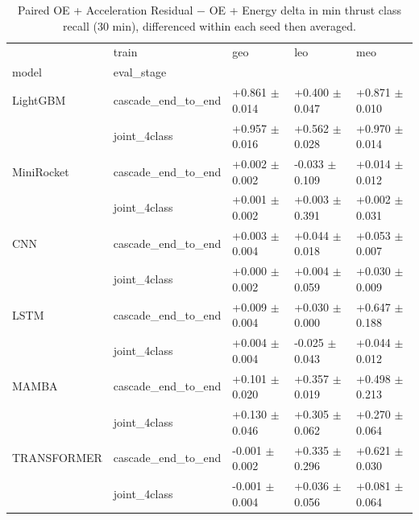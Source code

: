 \begin{table}
\centering
\caption{Paired OE + Acceleration Residual $-$ OE + Energy delta in min thrust class recall (30 min), differenced within each seed then averaged.}
\label{tab:featdelta_minrec_ladder}
\begin{tabular}{lllll}
\toprule
            & train &                 geo &                 leo &                 meo \\
model & eval_stage &                     &                     &                     \\
\midrule
LightGBM & cascade_end_to_end &  +0.861 $\pm$ 0.014 &  +0.400 $\pm$ 0.047 &  +0.871 $\pm$ 0.010 \\
            & joint_4class &  +0.957 $\pm$ 0.016 &  +0.562 $\pm$ 0.028 &  +0.970 $\pm$ 0.014 \\
MiniRocket & cascade_end_to_end &  +0.002 $\pm$ 0.002 &  -0.033 $\pm$ 0.109 &  +0.014 $\pm$ 0.012 \\
            & joint_4class &  +0.001 $\pm$ 0.002 &  +0.003 $\pm$ 0.391 &  +0.002 $\pm$ 0.031 \\
CNN & cascade_end_to_end &  +0.003 $\pm$ 0.004 &  +0.044 $\pm$ 0.018 &  +0.053 $\pm$ 0.007 \\
            & joint_4class &  +0.000 $\pm$ 0.002 &  +0.004 $\pm$ 0.059 &  +0.030 $\pm$ 0.009 \\
LSTM & cascade_end_to_end &  +0.009 $\pm$ 0.004 &  +0.030 $\pm$ 0.000 &  +0.647 $\pm$ 0.188 \\
            & joint_4class &  +0.004 $\pm$ 0.004 &  -0.025 $\pm$ 0.043 &  +0.044 $\pm$ 0.012 \\
MAMBA & cascade_end_to_end &  +0.101 $\pm$ 0.020 &  +0.357 $\pm$ 0.019 &  +0.498 $\pm$ 0.213 \\
            & joint_4class &  +0.130 $\pm$ 0.046 &  +0.305 $\pm$ 0.062 &  +0.270 $\pm$ 0.064 \\
TRANSFORMER & cascade_end_to_end &  -0.001 $\pm$ 0.002 &  +0.335 $\pm$ 0.296 &  +0.621 $\pm$ 0.030 \\
            & joint_4class &  -0.001 $\pm$ 0.004 &  +0.036 $\pm$ 0.056 &  +0.081 $\pm$ 0.064 \\
\bottomrule
\end{tabular}
\end{table}
